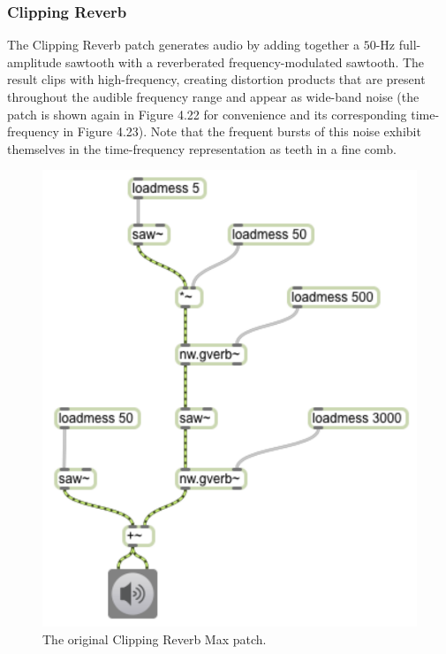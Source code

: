 \documentclass[a4paper,12pt]{report} 	%
\numberwithin{figure}{chapter}
\numberwithin{table}{chapter}
\numberwithin{equation}{chapter}
\begin{document}
\begin{flushleft}
\clearpage
\subsubsection{Clipping Reverb}
The Clipping Reverb patch generates audio by adding together a $50$-Hz full-amplitude sawtooth with a reverberated frequency-modulated sawtooth. The result clips with high-frequency, creating distortion products that are present throughout the audible frequency range and appear as wide-band noise (the patch is shown again in Figure 4.22 for convenience and its corresponding time-frequency in Figure 4.23). Note that the frequent bursts of this noise exhibit themselves in the time-frequency representation as teeth in a fine comb.
\begin{figure}[h!]
\begin{center}
\includegraphics[scale=0.8]{ClippingReverbSaw}
\caption[Original Clipping Reverb Max Patch]{The original Clipping Reverb Max patch.}
\end{center}
\end{figure}
\\
\begin{figure}[h!]

\end{figure}
\end{flushleft}
\end{document}
